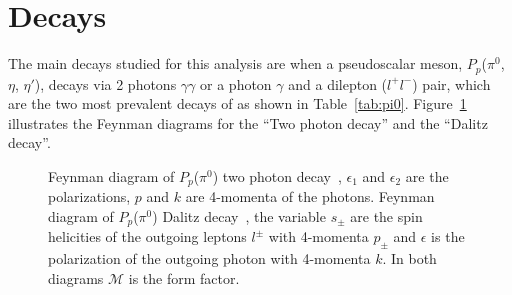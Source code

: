 \section{\piz Decays}\label{sec:intro.decays}
The main decays studied for this analysis are when a pseudoscalar meson, $P_p$($\pi^{0}$, $\eta$, $\eta'$), decays via 2 photons $\gamma \gamma$ or a photon $\gamma$ and a dilepton ($l^{+}l^{-}$) pair, which are the two most prevalent decays of \piz as shown in Table~\ref{tab:pi0}. Figure~\ref{fig:piz.alldecay} illustrates the Feynman diagrams for the ``Two photon decay'' and the ``Dalitz decay''.
\begin{figure}[h!]\begin{center}

\caption[Feynman diagram of $P_p$($\pi^0$) two photon decay and Dalitz decay]{\label{fig:piz.alldecay}Feynman diagram of $P_p$($\pi^0$) two photon decay~, $\epsilon_1$ and $\epsilon_2$ are the polarizations, $p$ and $k$ are 4-momenta of the photons.  Feynman diagram of $P_p$($\pi^0$) Dalitz decay~, the variable $s_\pm$ are the spin helicities of the outgoing leptons $l^\pm$ with 4-momenta $p_{\pm}$ and $\epsilon$ is the polarization of the outgoing photon with 4-momenta $k$. In both diagrams $\mathcal{M}$ is the form factor.}

\end{center}\end{figure}
\FloatBarrier

